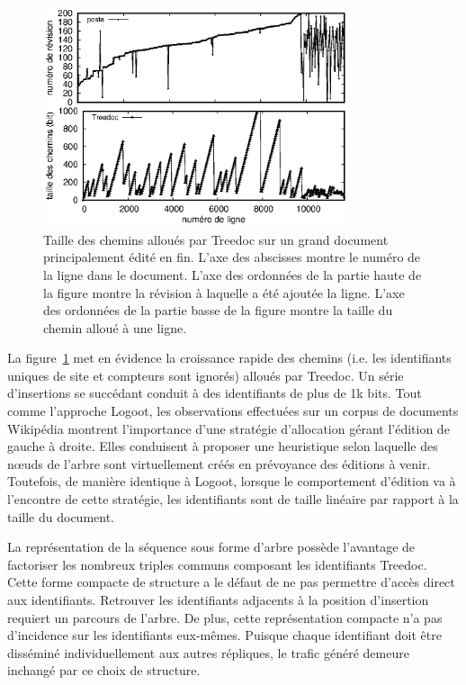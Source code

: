 \begin{figure}
  \begin{center}
    \includegraphics[width=0.8\textwidth]{img/lseq/motivationtreedoc.eps}
    \caption[Taille des chemins alloués par Treedoc sur un grand document édité
    en fin]{\label{repl:img:motivationtreedoc} Taille des chemins alloués par
      Treedoc sur un grand document principalement édité en fin. L'axe des
      abscisses montre le numéro de la ligne dans le document. L'axe des
      ordonnées de la partie haute de la figure montre la révision à laquelle a
      été ajoutée la ligne. L'axe des ordonnées de la partie basse de la figure
      montre la taille du chemin alloué à une ligne.}
  \end{center}
\end{figure}


\noindent La figure~\ref{repl:img:motivationtreedoc} met en évidence la
croissance rapide des chemins (i.e. les identifiants uniques de site et
compteurs sont ignorés) alloués par Treedoc. Un série d'insertions se succédant
conduit à des identifiants de plus de 1k bits. Tout comme l'approche Logoot, les
observations effectuées sur un corpus de documents Wikipédia montrent
l'importance d'une stratégie d'allocation gérant l'édition de gauche à
droite. Elles conduisent à proposer une heuristique selon laquelle des nœuds de
l'arbre sont virtuellement créés en prévoyance des éditions à venir. Toutefois,
de manière identique à Logoot, lorsque le comportement d'édition va à l'encontre
de cette stratégie, les identifiants sont de taille linéaire par rapport à la
taille du document.


\noindent La représentation de la séquence sous forme d'arbre possède l'avantage
de factoriser les nombreux triples communs composant les identifiants
Treedoc. Cette forme compacte de structure a le défaut de ne pas permettre
d'accès direct aux identifiants. Retrouver les identifiants adjacents à la
position d'insertion requiert un parcours de l'arbre. De plus, cette
représentation compacte n'a pas d'incidence sur les identifiants
eux-mêmes. Puisque chaque identifiant doit être disséminé individuellement aux
autres répliques, le trafic généré demeure inchangé par ce choix de structure.


